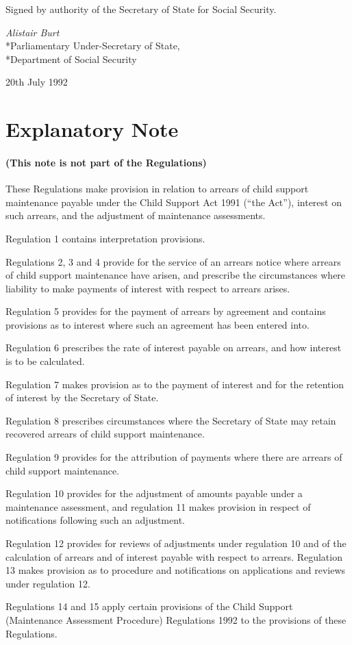 \documentclass[12pt,a4paper]{article}
\begin{document}
\bigskip

Signed by authority of the Secretary of State for Social Security.

{\raggedleft
\emph{Alistair Burt}\\*Parliamentary Under-Secretary of State,\\*Department of Social Security

}

20th July 1992

\part{Explanatory Note}

\renewcommand\parthead{--- Explanatory Note}

\subsection*{(This note is not part of the Regulations)}

 These Regulations make provision in relation to arrears of child support maintenance payable under the Child Support Act 1991 (“the Act”), interest on such arrears, and the adjustment of maintenance assessments.

  Regulation 1 contains interpretation provisions.

  Regulations 2, 3 and 4 provide for the service of an arrears notice where arrears of child support maintenance have arisen, and prescribe the circumstances where liability to make payments of interest with respect to arrears arises.

  Regulation 5 provides for the payment of arrears by agreement and contains provisions as to interest where such an agreement has been entered into.

  Regulation 6 prescribes the rate of interest payable on arrears, and how interest is to be calculated.

  Regulation 7 makes provision as to the payment of interest and for the retention of interest by the Secretary of State.

  Regulation 8 prescribes circumstances where the Secretary of State may retain recovered arrears of child support maintenance.

  Regulation 9 provides for the attribution of payments where there are arrears of child support maintenance.

  Regulation 10 provides for the adjustment of amounts payable under a maintenance assessment, and regulation 11 makes provision in respect of notifications following such an adjustment.

  Regulation 12 provides for reviews of adjustments under regulation 10 and of the calculation of arrears and of interest payable with respect to arrears. Regulation 13 makes provision as to procedure and notifications on applications and reviews under regulation 12.

  Regulations 14 and 15 apply certain provisions of the Child Support (Maintenance Assessment Procedure) Regulations 1992 to the provisions of these Regulations.
\end{document}
